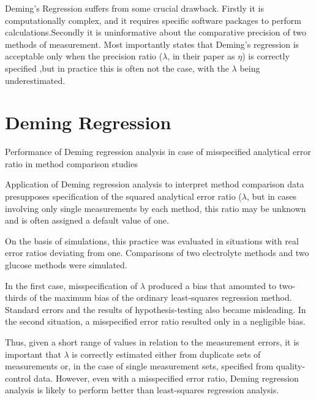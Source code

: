 	Deming's Regression suffers from some crucial drawback. Firstly it
	is computationally complex, and it requires specific software
	packages to perform calculations.Secondly it is uninformative
	about the comparative precision of two methods of measurement.
	Most importantly \citet{CarollRupert} states that Deming's
	regression is acceptable only when the precision ratio ($\lambda$,
	in their paper as $\eta$) is correctly specified ,but in practice
	this is often not the case, with the $\lambda$ being
	underestimated.
	\newpage
	
	

\section*{Deming Regression}

Performance of Deming regression analysis in case of misspecified analytical error ratio in method comparison studies

Application of Deming regression analysis to interpret method comparison data presupposes specification of the 
squared analytical error ratio ($\lambda$, but in cases involving only single measurements by each method, this 
ratio may be unknown and is often assigned a default value of one. 

On the basis of simulations, this practice was evaluated in situations with real error ratios deviating from one. 
Comparisons of two electrolyte methods and two glucose methods were simulated. 

In the first case, misspecification of $\lambda$ produced a bias that amounted to two-thirds of the maximum bias of the 
ordinary least-squares regression method. Standard errors and the results of hypothesis-testing also became misleading. 
In the second situation, a misspecified error ratio resulted only in a negligible bias. 

Thus, given a short range of values in relation to the measurement errors, it is important that $\lambda$ is correctly 
estimated either from duplicate sets of measurements or, in the case of single measurement sets, specified from 
quality-control data. However, even with a misspecified error ratio, Deming regression analysis is likely to perform 
better than least-squares regression analysis.


